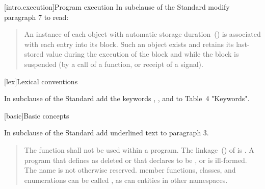 %

[intro.execution]{Program execution}
In subclause  of the \Cpp Standard modify paragraph 7 to read:
\begin{quote}
\setcounter{Paras}{6}
\pnum 
An instance of each object with automatic storage 
duration~() is associated with each entry into its 
block. Such an object exists and retains its last-stored value during 
the execution of the block and while the block is suspended (by a call 
of a function, 
or receipt of a signal). 
\end{quote}

[lex]{Lexical conventions}

In subclause  of the \Cpp Standard 
add the keywords , , and
 to Table~4 "Keywords".


[basic]{Basic concepts}



In subclause  of the \Cpp Standard 
add underlined text to paragraph 3.

\begin{quote}
	\setcounter{Paras}{2}
	
	\pnum
	The function  shall not be used within
	a program.
	The linkage~() of  is
	. A program that defines  as
	deleted or that declares  to be
	 , or  is ill-formed. 
	The name  is
	not otherwise reserved. \enterexample member functions, classes, and
	enumerations can be called , as can entities in other
	namespaces. \exitexample
\end{quote}

